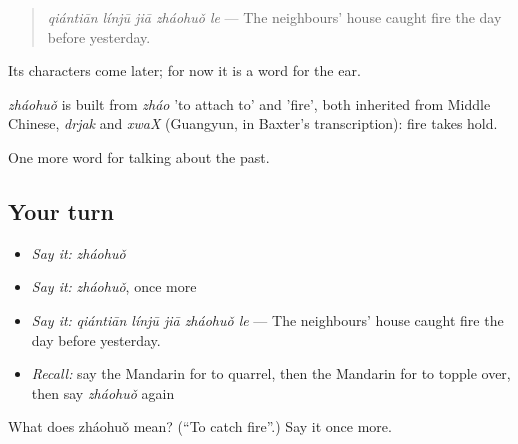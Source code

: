 \begin{quote}
\emph{qiántiān línjū jiā zháohuǒ le} — The neighbours' house caught fire the day before yesterday.
\end{quote}

Its characters come later; for now it is a word for the ear.

\begin{cousinweb}
\emph{zháohuǒ} is built from \emph{zháo} 'to attach to' and  'fire', both inherited from Middle Chinese, \emph{drjak} and \emph{xwaX} (Guangyun, in Baxter's transcription): fire takes hold.
\end{cousinweb}

\begin{grammarlens}[title={What you've built}]
One more word for talking about the past.
\end{grammarlens}

\subsection*{Your turn}
\begin{itemize}
\raggedright
  \item \emph{Say it:} \emph{zháohuǒ}
  \item \emph{Say it:} \emph{zháohuǒ}, once more
  \item \emph{Say it:} \emph{qiántiān línjū jiā zháohuǒ le} — The neighbours' house caught fire the day before yesterday.
  \item \emph{Recall:} say the Mandarin for to quarrel, then the Mandarin for to topple over, then say \emph{zháohuǒ} again
\end{itemize}

\begin{tcolorbox}[breakable,colback=teal!4,colframe=teal!35!black,title={Before you move on}]
What does zháohuǒ mean? (\textquotedblleft{}To catch fire\textquotedblright{}.) Say it once more.
\end{tcolorbox}
